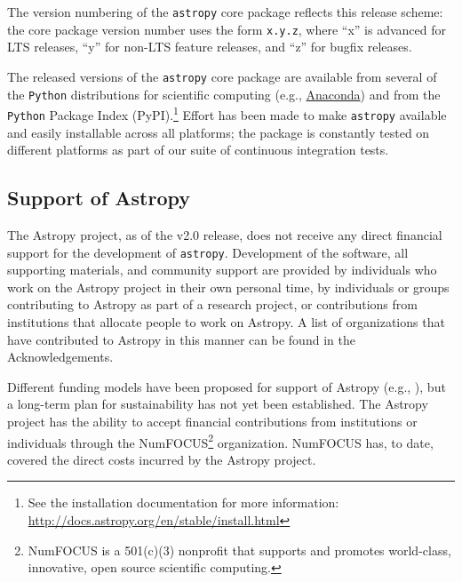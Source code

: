 \documentclass[modern]{aastex61}
\newcommand{\package}[1]{\texttt{#1}\xspace}
\newcommand{\python}{\package{Python}}
\newcommand{\astropy}{Astropy\xspace}
\newcommand{\astropypkg}{\package{astropy}}
\begin{document}
The version numbering of the \astropypkg core package reflects this release
scheme: the core package version number uses the form \texttt{x.y.z}, where ``x'' is
advanced for LTS releases, ``y'' for non-LTS feature releases, and
``z'' for bugfix releases.

The released versions of the \astropypkg core package are available from several
of the \python distributions for scientific computing (e.g.,
\href{http://anaconda.org}{Anaconda}) and from the \python Package Index
(PyPI).\footnote{See the installation documentation for more information:
\url{http://docs.astropy.org/en/stable/install.html}}
Effort has been made to make \astropypkg available and easily installable across
all platforms; the package is constantly tested on different platforms as part
of our suite of continuous integration tests.

\subsection{Support of Astropy}

The \astropy project, as of the v2.0 release, does not receive any direct financial support for
the development of \astropypkg.  Development of the software, all supporting materials, and community support are provided
by individuals who work on the \astropy project in their own personal
time, by individuals or groups contributing to \astropy as
part of a research project, or contributions from institutions that allocate
people to work on \astropy.
A list of organizations that have contributed to \astropy in this manner
can be found in the Acknowledgements.

Different funding models have been proposed for support of \astropy
(e.g., \citealt{2016arXiv161003159M}), but a long-term plan
for sustainability has not yet been established.
The \astropy project has the ability to accept financial contributions
from institutions or individuals through the NumFOCUS\footnote{NumFOCUS
is a 501(c)(3) nonprofit that supports and promotes world-class, innovative,
open source scientific computing.} organization. NumFOCUS has, to date, covered the direct costs incurred by the \astropy project.



\end{document}
